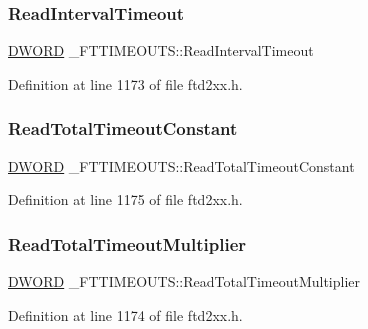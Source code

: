 \subsubsection{\texorpdfstring{Read\+Interval\+Timeout}{ReadIntervalTimeout}}
{\footnotesize\ttfamily \hyperlink{CatCaloProto40MHz_2inc_2WinTypes_8h_ad342ac907eb044443153a22f964bf0af}{D\+W\+O\+RD} \+\_\+\+F\+T\+T\+I\+M\+E\+O\+U\+T\+S\+::\+Read\+Interval\+Timeout}



Definition at line 1173 of file ftd2xx.\+h.

\mbox{\label{struct__FTTIMEOUTS_aa6478849c632565b01f91faca975cabe}} 
\subsubsection{\texorpdfstring{Read\+Total\+Timeout\+Constant}{ReadTotalTimeoutConstant}}
{\footnotesize\ttfamily \hyperlink{CatCaloProto40MHz_2inc_2WinTypes_8h_ad342ac907eb044443153a22f964bf0af}{D\+W\+O\+RD} \+\_\+\+F\+T\+T\+I\+M\+E\+O\+U\+T\+S\+::\+Read\+Total\+Timeout\+Constant}



Definition at line 1175 of file ftd2xx.\+h.

\mbox{\label{struct__FTTIMEOUTS_abec01499b73ce0bd194ca0628dbf58e8}} 
\subsubsection{\texorpdfstring{Read\+Total\+Timeout\+Multiplier}{ReadTotalTimeoutMultiplier}}
{\footnotesize\ttfamily \hyperlink{CatCaloProto40MHz_2inc_2WinTypes_8h_ad342ac907eb044443153a22f964bf0af}{D\+W\+O\+RD} \+\_\+\+F\+T\+T\+I\+M\+E\+O\+U\+T\+S\+::\+Read\+Total\+Timeout\+Multiplier}



Definition at line 1174 of file ftd2xx.\+h.


